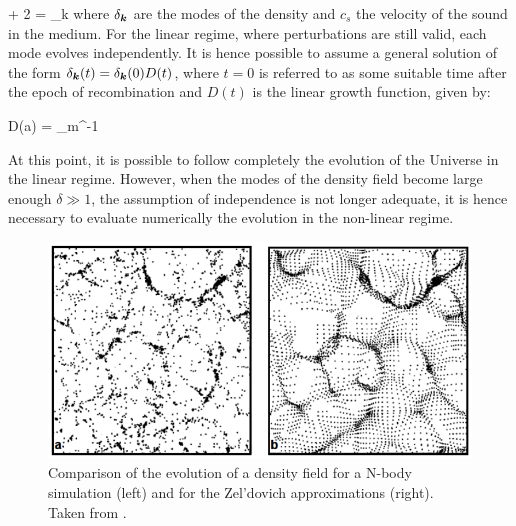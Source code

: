 \documentclass[a4,useAMS,usenatbib,usegraphicx,12pt]{article}
\begin{document}
{  + 2 =
\delta_{\bds k} }
where $\delta_{\boldsymbol{ k }}$ are the modes of the density and $c_s$ the velocity of 
the sound in the medium. For the linear regime, where perturbations are still
valid, each mode evolves independently. It is hence possible to assume a general
solution of the form $\delta_{\boldsymbol{ k }}(t) = \delta_{\boldsymbol{ k }}(0) D(t)$, where $t=0$ 
is referred to as some suitable time after the epoch of recombination and $D(t)$
is the linear growth function, given by:

{ D(a) = \Omega_m^{-1} }

At this point, it is possible to follow completely the evolution of the Universe
in the linear regime. However, when the modes of the density field become large
enough $\delta\gg 1$, the assumption of independence is not longer adequate, it 
is hence necessary to evaluate numerically the evolution in the non-linear 
regime.

\begin{figure}[h]
\centering

  \includegraphics[trim = 0mm 0mm 0mm 2mm, clip, keepaspectratio=true,
  width=0.4\textheight]{./figures/Zeldovich_Approximation.png}
  
  \caption{\small Comparison of the evolution of a density field for a 
  N-body simulation (left) and for the Zel'dovich approximations (right).
  Taken from \cite{longair2008}.}

  \label{fig:Zeldovich}

\end{figure}
\end{document}
